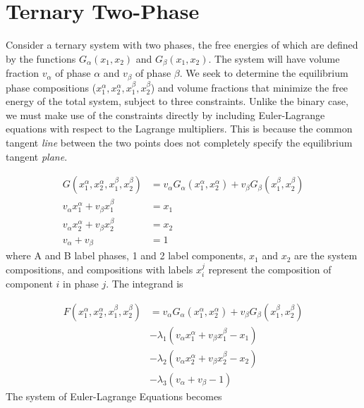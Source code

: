 \documentclass[10pt]{article}
\begin{document}
\newpage
\section*{Ternary Two-Phase}

Consider a ternary system with two phases, the free energies of which are
defined by the functions $G_{\alpha}(x_1, x_2)$ and $G_{\beta}(x_1, x_2)$. The
system will have volume fraction $v_{\alpha}$ of phase $\alpha$ and $v_{\beta}$
of phase $\beta$. We seek to determine the equilibrium phase compositions
($x_1^{\alpha}, x_2^{\alpha}, x_1^{\beta}, x_2^{\beta}$) and volume fractions
that minimize the free energy of the total system, subject to three constraints.
Unlike the binary case, we must make use of the constraints directly by
including Euler-Lagrange equations with respect to the Lagrange multipliers.
This is because the common tangent \emph{line} between the two points does not
completely specify the equilibrium tangent \emph{plane}.

\begin{align}
  G(x_1^{\alpha}, x_2^{\alpha}, x_1^{\beta}, x_2^{\beta})
  &= v_{\alpha} G_{\alpha}(x_1^{\alpha},x_2^{\alpha})
   + v_{\beta} G_{\beta}(x_1^{\beta}, x_2^{\beta})\\
  v_{\alpha} x_1^{\alpha} + v_{\beta} x_1^{\beta} &= x_1\\
  v_{\alpha} x_2^{\alpha} + v_{\beta} x_2^{\beta} &= x_2\\
  v_{\alpha} + v_{\beta} &= 1
\end{align}
where A and B label phases, 1 and 2 label components, $x_1$ and $x_2$ are the
system compositions, and compositions with labels $x_i^j$ represent the
composition of component $i$ in phase $j$. The integrand is

\begin{align}
  \nonumber
  F(x_1^{\alpha}, x_2^{\alpha}, x_1^{\beta}, x_2^{\beta})
  &= v_{\alpha} G_{\alpha}(x_1^{\alpha}, x_2^{\alpha})
   + v_{\beta} G_{\beta}(x_1^{\beta}, x_2^{\beta})\\
  \nonumber
  &- \lambda_1(v_{\alpha} x_1^{\alpha} + v_{\beta} x_1^{\beta} - x_1)\\
  \nonumber
  &- \lambda_2(v_{\alpha} x_2^{\alpha} + v_{\beta} x_2^{\beta} - x_2)\\
  &- \lambda_3(v_{\alpha} + v_{\beta} - 1)
\end{align}
The system of Euler-Lagrange Equations becomes
\end{document}
